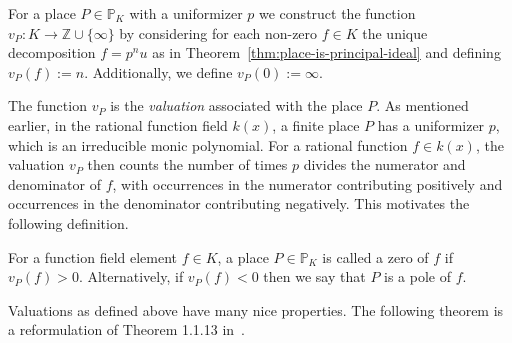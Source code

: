 \begin{definition}%
  \label{def:valuation}
  For a place \(P \in \mathbb{P}_{K}\) with a uniformizer \(p\) we construct the function \(v_{P} : K \to \mathbb{Z} \cup \{\infty\}\) by considering for each non-zero \(f \in K\) the unique decomposition \(f = p^{n}u\) as in Theorem~\ref{thm:place-is-principal-ideal} and defining \(v_{P}(f) := n\). Additionally, we define \({v_{P}(0) := \infty}\).
\end{definition}

The function \(v_{P}\) is the \textit{valuation} associated with the place \(P\). As mentioned earlier, in the rational function field \(k(x)\), a finite place \(P\) has a uniformizer \(p\), which is an irreducible monic polynomial. For a rational function \(f \in k(x)\), the valuation \(v_{P}\) then counts the number of times \(p\) divides the numerator and denominator of \(f\), with occurrences in the numerator contributing positively and occurrences in the denominator contributing negatively. This motivates the following definition.

\begin{definition}%
  \label{def:zero-and-pole}
  For a function field element \(f \in K\), a place \(P \in \mathbb{P}_{K}\) is called a zero of \(f\) if \(v_{P}(f) > 0\). Alternatively, if \(v_{P}(f) < 0\) then we say that \(P\) is a pole of \(f\).
\end{definition}


Valuations as defined above have many nice properties. The following theorem is a reformulation of Theorem 1.1.13 in~\cite{stichtenoth-2009-algebraic-function-fields}.

